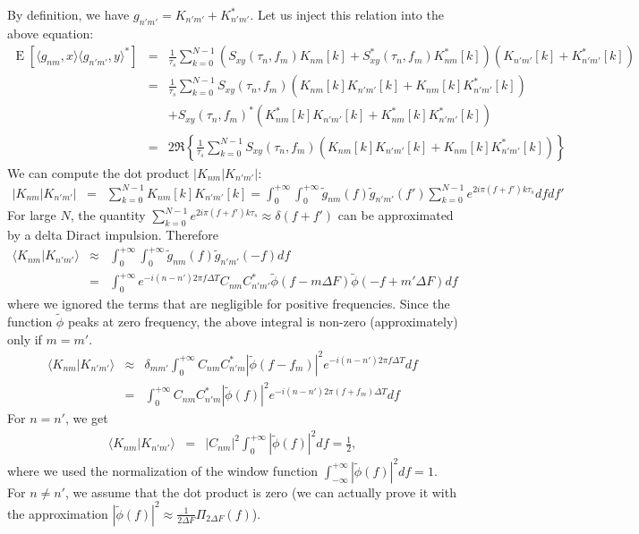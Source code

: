 \documentclass{article}
\begin{document}
By definition, we have $g_{n'm'} = K_{n'm'} + K_{n'm'}^{\ast}$. Let us inject this relation into the above equation:
\begin{eqnarray}
\label{eq:cross_cov_operator_property-applied-2}
\operatorname{E}\left[ \langle g_{nm} , x \rangle \langle g_{n'm'}, y \rangle^{\ast} \right]  
    & = & \frac{1}{\tau_s} \sum_{k=0}^{N-1} \left( S_{xy}(\tau_n, f_m) K_{nm}[k] + S_{xy}^{\ast} (\tau_n, f_m)K_{nm}^{\ast}[k] \right) \left(K_{n'm'}[k] + K_{n'm'}^{\ast}[k] \right)\nonumber \\
    & = & \frac{1}{\tau_s} \sum_{k=0}^{N-1} S_{xy}(\tau_n, f_m) \left( K_{nm}[k]K_{n'm'}[k] +  K_{nm}[k] K_{n'm'}^{\ast}[k] \right) \nonumber \\
    && + S_{xy}(\tau_n, f_m)^{\ast} \left( K_{nm}^{\ast}[k] K_{n'm'}[k] + K_{nm}^{\ast}[k] K_{n'm'}^{\ast}[k]\right)
    \nonumber \\
    &=& 2 \Re\left\{ \frac{1}{\tau_s} \sum_{k=0}^{N-1} S_{xy}(\tau_n, f_m) \left( K_{nm}[k]K_{n'm'}[k] +  K_{nm}[k] K_{n'm'}^{\ast}[k] \right) \right\}
\end{eqnarray}
We can compute the dot product $\lvert K_{nm} |  K_{n'm'} \rvert$:
\begin{eqnarray*}
    \lvert K_{nm} |  K_{n'm'} \rvert &=& \sum_{k=0}^{N-1} K_{nm}[k]K_{n'm'}[k] = \int_{0}^{+\infty}\int_{0}^{+\infty} \tilde{g}_{nm}(f) \tilde{g}_{n'm'}(f') \sum_{k=0}^{N-1}  e^{2i\pi (f + f') k \tau_s} df df'
\end{eqnarray*}
For large $N$, the quantity $\sum_{k=0}^{N-1}  e^{2i\pi (f + f') k \tau_s} \approx \delta(f+f')$ can be approximated by a delta Diract impulsion. Therefore
\begin{eqnarray*}
    \langle K_{nm} |  K_{n'm'} \rangle
    & \approx & \int_{0}^{+\infty}\int_{0}^{+\infty} \tilde{g}_{nm}(f) \tilde{g}_{n'm'}(-f) df \\
    & = & \int_{0}^{+\infty} e^{-i (n-n') 2 \pi f \Delta T} C_{n m} C_{n' m'}^{*} \tilde{\phi}(f-m \Delta F) \tilde{\phi}(-f+m' \Delta F)df
\end{eqnarray*}
where we ignored the terms that are negligible for positive frequencies. Since the function $\tilde{\phi}$ peaks at zero frequency, the above integral is non-zero (approximately) only if $m=m'$.
\begin{eqnarray*}
    \langle K_{nm} |  K_{n'm'} \rangle
    & \approx &  \delta_{m m'} \int_{0}^{+\infty} C_{n m} C_{n' m}^{*} | \tilde{\phi}(f-f_m) |^2 e^{-i (n-n') 2 \pi f \Delta T}  df \\
    & = & \int_{0}^{+\infty} C_{n m} C_{n' m}^{*} | \tilde{\phi}(f) |^2 e^{-i (n-n') 2 \pi (f+f_m) \Delta T}  df
\end{eqnarray*}
For $n = n'$, we get  
\begin{eqnarray*}
    \langle K_{nm} |  K_{n'm'} \rangle & = &  | C_{n m} |^2 \int_{0}^{+\infty}| \tilde{\phi}(f) |^2  df = \frac{1}{2},
\end{eqnarray*}
where we used the normalization of the window function $\int_{-\infty}^{+\infty}| \tilde{\phi}(f) |^2  df = 1$. For $n \neq n'$, we assume that the dot product is zero (we can actually prove it with the approximation $| \tilde{\phi}(f) |^2 \approx \frac{1}{2\Delta F} \Pi_{2\Delta F}(f)$). 
\end{document}

